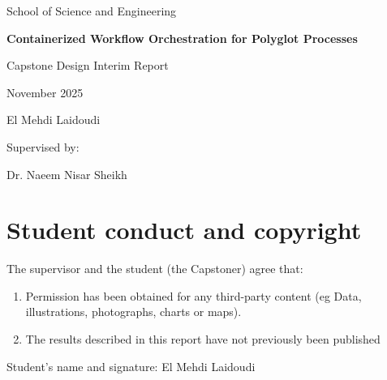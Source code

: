 \documentclass[12pt]{article}
\begin{document}
\begin{titlepage}
\centering
\vspace*{2cm}

{\Large School of Science and Engineering}

\vspace{2cm}

{\Large \textbf{Containerized Workflow Orchestration for Polyglot Processes}}

\vspace{1cm}

{\Large Capstone Design Interim Report}

\vspace{0.5cm}


\vspace{2cm}

{\Large November 2025}

\vspace{2cm}

{\Large El Mehdi Laidoudi}

\vspace{1cm}

{\Large Supervised by:}

\vspace{0.5cm}

{\Large Dr. Naeem Nisar Sheikh}

\end{titlepage}

\newpage
\section*{Student conduct and copyright}

The supervisor and the student (the Capstoner) agree that:

\begin{enumerate}
    \item Permission has been obtained for any third-party content (eg Data, illustrations, photographs, charts or maps).
    \item The results described in this report have not previously been published
\end{enumerate}

\vspace{2cm}

Student's name and signature: El Mehdi Laidoudi \hspace{2cm} \underline{\hspace{5cm}}
\end{document}
